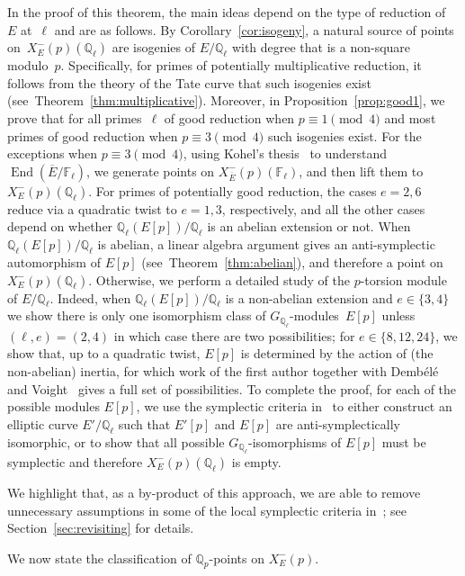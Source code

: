 \documentclass[12pt]{amsart}
\numberwithin{equation}{section}
\theoremstyle{definition}
\newcommand{\F}{\mathbb{F}}
\newcommand{\Q}{\mathbb{Q}}
\newcommand{\Xp}{X_E^{-}(p)}
\newcommand{\Ebar}{{\overline{E}}}
\DeclareMathOperator{\End}{End}
\begin{document}
\vspace{-3mm}
In the proof of this theorem, the main ideas depend on the type of reduction of~$E$ at~$\ell$ and are as follows. By Corollary~\ref{cor:isogeny}, a natural source of points on~$\Xp(\Q_\ell)$ are isogenies of $E/\Q_\ell$ with degree that is a non-square modulo~$p$. Specifically, for primes of
potentially multiplicative reduction, it follows from the theory of the Tate curve that such isogenies exist (see~Theorem~\ref{thm:multiplicative}). Moreover, in Proposition~\ref{prop:good1}, we prove that
for all primes~$\ell$ of good reduction when $p \equiv 1 \pmod{4}$ and most primes of good reduction when $p\equiv 3 \pmod{4}$ such isogenies exist. For the exceptions when $p \equiv 3 \pmod{4}$, using Kohel's thesis~\cite{Kohel} to understand $\End(\overline{E}/\F_\ell)$, we generate points on $X_\Ebar^-(p)(\F_\ell)$, and then lift them to~$\Xp(\Q_\ell)$.
For primes of potentially good reduction, the cases $e=2,6$ reduce via a quadratic twist to $e=1,3$, respectively, and all the other cases depend on whether $\Q_\ell(E[p])/\Q_\ell$ is an abelian extension or not. 
When $\Q_\ell(E[p])/\Q_\ell$ is abelian, a linear algebra argument gives an anti-symplectic automorphism of $E[p]$ (see~Theorem~\ref{thm:abelian}), and therefore a point on $\Xp(\Q_\ell)$. Otherwise,
we perform a detailed study of the $p$-torsion
module of $E/\Q_\ell$. Indeed, when $\Q_\ell(E[p])/\Q_\ell$ is a non-abelian extension and $e \in \{3,4\}$ we show there is only one isomorphism class of $G_{\Q_\ell}$-modules~$E[p]$
unless $(\ell,e)= (2,4)$ in which case there are two possibilities; for $e \in \{8,12,24\}$, we show that, up to a quadratic twist, $E[p]$ is determined by the action of (the non-abelian) inertia, for which work of the first author together with Demb\'el\'e and Voight~\cite{inertial} gives a full set of possibilities. To complete the proof, 
for each of the possible modules $E[p]$, we use the 
symplectic criteria in~\cite{symplectic} to either construct an elliptic curve $E'/\Q_\ell$ such that $E'[p]$ and $E[p]$ are anti-symplectically isomorphic, or to show that all possible $G_{\Q_\ell}$-isomorphisms of $E[p]$ must be symplectic and therefore $\Xp(\Q_\ell)$ is empty.

We highlight that, as a by-product of this approach, we 
are able to remove unnecessary assumptions in some of the local symplectic criteria in~\cite{symplectic}; see Section~\ref{sec:revisiting} for details.

We now state the classification of $\Q_p$-points on $\Xp$.
\end{document}
